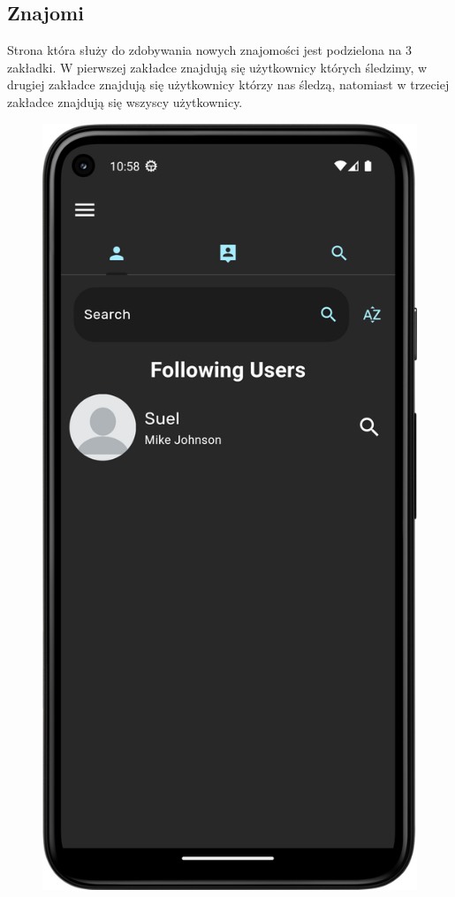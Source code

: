 \documentclass[a4paper,twoside,12pt]{book}
\begin{document}
\subsection{Znajomi}
Strona która służy do zdobywania nowych znajomości jest podzielona na 3 zakładki. W pierwszej zakładce znajdują się użytkownicy których śledzimy, w drugiej zakładce znajdują się użytkownicy którzy nas śledzą, natomiast w trzeciej zakładce znajdują się wszyscy użytkownicy. 

\begin{figure}[H]
  \centering
  \begin{minipage}[b]{0.30\textwidth}
    \includegraphics[width=\textwidth]{mobile_ss/followani.png}

\end{minipage}
\end{figure}
\end{document}
